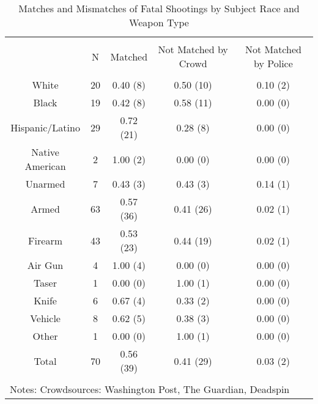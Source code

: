 
\begin{table}[!htbp] \centering 
  \caption{Matches and Mismatches of Fatal Shootings by Subject Race and Weapon Type} 
  \label{} 
\footnotesize 
\begin{tabular}{@{\extracolsep{5pt}} ccccc} 
\\[-1.8ex]\hline 
\hline \\[-1.8ex] 
 & N & Matched & Not Matched by Crowd & Not Matched by Police \\ 
\hline \\[-1.8ex] 
White & 20 & 0.40 (8) & 0.50 (10) & 0.10 (2) \\ 
Black & 19 & 0.42 (8) & 0.58 (11) & 0.00 (0) \\ 
Hispanic/Latino & 29 & 0.72 (21) & 0.28 (8) & 0.00 (0) \\ 
Native American & 2 & 1.00 (2) & 0.00 (0) & 0.00 (0) \\ 
Unarmed & 7 & 0.43 (3) & 0.43 (3) & 0.14 (1) \\ 
Armed & 63 & 0.57 (36) & 0.41 (26) & 0.02 (1) \\ 
Firearm & 43 & 0.53 (23) & 0.44 (19) & 0.02 (1) \\ 
Air Gun & 4 & 1.00 (4) & 0.00 (0) & 0.00 (0) \\ 
Taser & 1 & 0.00 (0) & 1.00 (1) & 0.00 (0) \\ 
Knife & 6 & 0.67 (4) & 0.33 (2) & 0.00 (0) \\ 
Vehicle & 8 & 0.62 (5) & 0.38 (3) & 0.00 (0) \\ 
Other & 1 & 0.00 (0) & 1.00 (1) & 0.00 (0) \\ 
Total & 70 & 0.56 (39) & 0.41 (29) & 0.03 (2) \\ 
\hline \\[-1.8ex] 
\multicolumn{5}{l}{Notes: Crowdsources: Washington Post, The Guardian, Deadspin} \\ 
\end{tabular} 
\end{table}  

